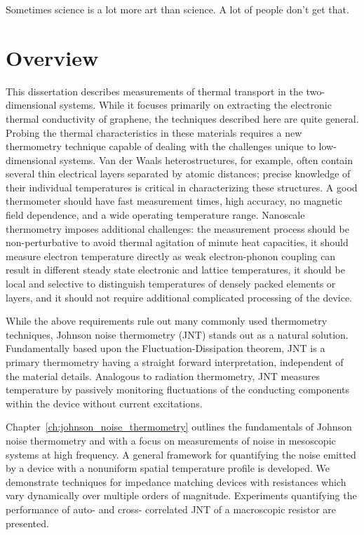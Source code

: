 \begin{savequote}[75mm]
Sometimes science is a lot more art than science. A lot of people don't get that.
\end{savequote}
\chapter{Overview}
\label{ch:overview}
This dissertation describes measurements of thermal transport in the two-dimensional systems. While it focuses primarily on extracting the electronic thermal conductivity of graphene, the techniques described here are quite general. Probing the thermal characteristics in these materials requires a new thermometry technique capable of dealing with the challenges unique to low-dimensional systems. Van der Waals heterostructures, for example, often contain several thin electrical layers separated by atomic distances; precise knowledge of their individual temperatures is critical in characterizing these structures. A good thermometer should have fast measurement times, high accuracy, no magnetic field dependence, and a wide operating temperature range. Nanoscale thermometry imposes additional challenges: the measurement process should be non-perturbative to avoid thermal agitation of minute heat capacities, it should measure electron temperature directly as weak electron-phonon coupling can result in different steady state electronic and lattice temperatures, it should be local and selective to distinguish temperatures of densely packed elements or layers, and it should not require additional complicated processing of the device.

While the above requirements rule out many commonly used thermometry techniques, Johnson noise thermometry (JNT) stands out as a natural solution. Fundamentally based upon the Fluctuation-Dissipation theorem, JNT is a primary thermometry having a straight forward interpretation, independent of the material details. Analogous to radiation thermometry, JNT measures temperature by passively monitoring fluctuations of the conducting components within the device without current excitations.

Chapter~\ref{ch:johnson_noise_thermometry} outlines the fundamentals of Johnson noise thermometry and with a focus on measurements of noise in mesoscopic systems at high frequency. A general framework for quantifying the noise emitted by a device with a nonuniform spatial temperature profile is developed. We demonstrate techniques for impedance matching devices with resistances which vary dynamically over multiple orders of magnitude. Experiments quantifying the performance of auto- and cross- correlated JNT of a macroscopic resistor are presented.

